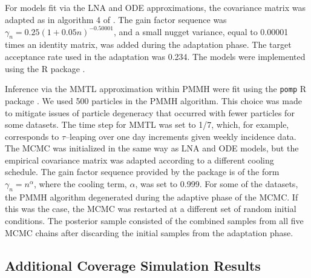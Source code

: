 For models fit via the LNA and ODE approximations, the covariance matrix was adapted as in algorithm 4 of \cite{andrieu2008tutorial}. The gain factor sequence was $\gamma_n = 0.25(1 + 0.05n)^{-0.50001}$, and a small nugget variance, equal to 0.00001 times an identity matrix, was added during the adaptation phase. The target acceptance rate used in the adaptation was 0.234. The models were implemented using the  R package \cite{stemr}.

Inference via the MMTL approximation within PMMH were fit using the \texttt{pomp} R package \cite{pompjss}. We used 500 particles in the PMMH algorithm. This choice was made to mitigate issues of particle degeneracy that occurred with fewer particles for some datasets. The time step for MMTL was set to 1/7, which, for example, corresponds to $ \tau $--leaping over one day increments given weekly incidence data. The MCMC was initialized in the same way as LNA and ODE models, but the empirical covariance matrix was adapted according to a different cooling schedule. The gain factor sequence provided by the package is of the form $ \gamma_n = n^\alpha $, where the cooling term, $ \alpha $, was set to 0.999. For some of the datasets, the PMMH algorithm degenerated during the adaptive phase of the MCMC. If this was the case, the MCMC was restarted at a different set of random initial conditions. The posterior sample consisted of the combined samples from all five MCMC chains after discarding the initial samples from the adaptation phase.

\newpage
\subsection{Additional Coverage Simulation Results}
\label{subsec:lna_coverage_additional_results}

